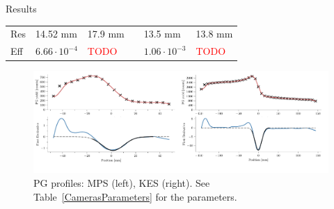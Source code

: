 \documentclass[final]{beamer} %
\newcommand{\tcr}[1]{\textcolor{red}{#1}}
\begin{document}
\begin{frame}{}
\begin{columns}[t]
\begin{column}{0.49\textwidth}
\begin{block}{Results}
\begin{table}[h]
\begin{tabular}{llllll}
				Res		& 14.52 mm								& 17.9 mm 	 					&& 13.5 mm								& 13.8 mm						\\
				Eff		& $6.66 \cdot 10^{-4}$  & \tcr{TODO}	&&	$1.06 \cdot 10^{-3}$   & \tcr{TODO}	\\
				\midrule
			\end{tabular}
			\end{table}			
			{}
% 
% 				
% 

			
				\begin{figure}
					\includegraphics[width=\textwidth]{./figures/output-crop}			
					\caption{PG profiles: MPS (left), KES (right). See Table~\ref{CamerasParameters} for the parameters.}
					\label{PGprofiles}
				\end{figure}					
				

\end{block}
\end{column}
\end{columns}
\end{frame}
\end{document}
